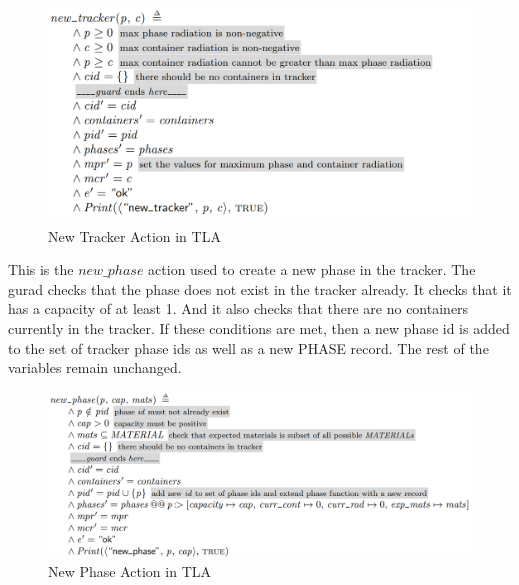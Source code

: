 \begin{figure}[!htb]
\begin{center}
\includegraphics[width=.99\textwidth]{images/new_tracker.png}
\end{center}
\caption{New Tracker Action in TLA}
\label{fig:new_tracker_action}
\end{figure}

\newpage
This is the $new\_phase$ action used to create a new phase in the tracker. The gurad checks that the phase does not exist in the tracker already. It checks that it has a capacity of at least 1. And it also checks that there are no containers currently in the tracker. If these conditions are met, then a new phase id is added to the set of tracker phase ids as well as a new PHASE record. The rest of the variables remain unchanged.   
\begin{figure}[!htb]
\begin{center}
\includegraphics[width=.99\textwidth]{images/new_phase.png}
\end{center}
\caption{New Phase Action in TLA}
\label{fig:new_phase_action}
\end{figure}

